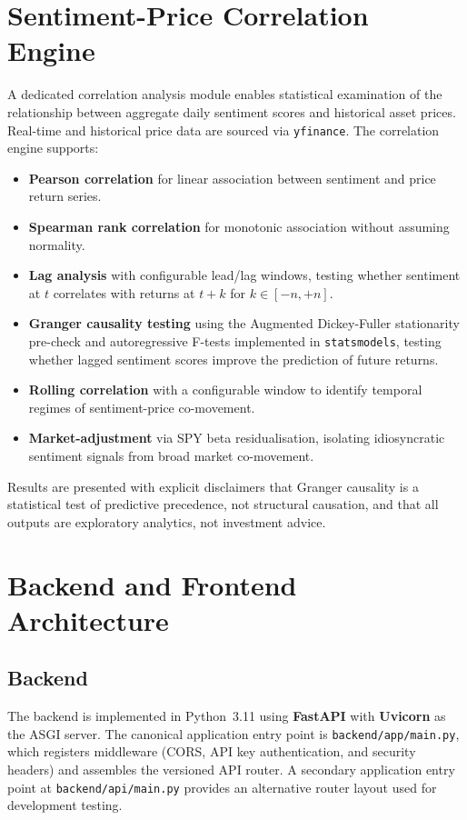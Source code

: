 \section{Sentiment-Price Correlation Engine}
\label{sec:correlation_design}

A dedicated correlation analysis module enables statistical examination of the relationship between aggregate daily sentiment scores and historical asset prices.  Real-time and historical price data are sourced via \texttt{yfinance}.  The correlation engine supports:
\begin{itemize}
    \item \textbf{Pearson correlation} for linear association between sentiment and price return series.
    \item \textbf{Spearman rank correlation} for monotonic association without assuming normality.
    \item \textbf{Lag analysis} with configurable lead/lag windows, testing whether sentiment at $t$ correlates with returns at $t+k$ for $k \in [-n, +n]$.
    \item \textbf{Granger causality testing} \citep{granger1969} using the Augmented Dickey-Fuller stationarity pre-check and autoregressive F-tests implemented in \texttt{statsmodels}, testing whether lagged sentiment scores improve the prediction of future returns.
    \item \textbf{Rolling correlation} with a configurable window to identify temporal regimes of sentiment-price co-movement.
    \item \textbf{Market-adjustment} via SPY beta residualisation, isolating idiosyncratic sentiment signals from broad market co-movement.
\end{itemize}

Results are presented with explicit disclaimers that Granger causality is a statistical test of predictive precedence, not structural causation, and that all outputs are exploratory analytics, not investment advice.

\section{Backend and Frontend Architecture}
\label{sec:architecture}

\subsection{Backend}

The backend is implemented in Python~3.11 using \textbf{FastAPI} with \textbf{Uvicorn} as the ASGI server.  The canonical application entry point is \texttt{backend/app/main.py}, which registers middleware (CORS, API key authentication, and security headers) and assembles the versioned API router.  A secondary application entry point at \texttt{backend/api/main.py} provides an alternative router layout used for development testing.

